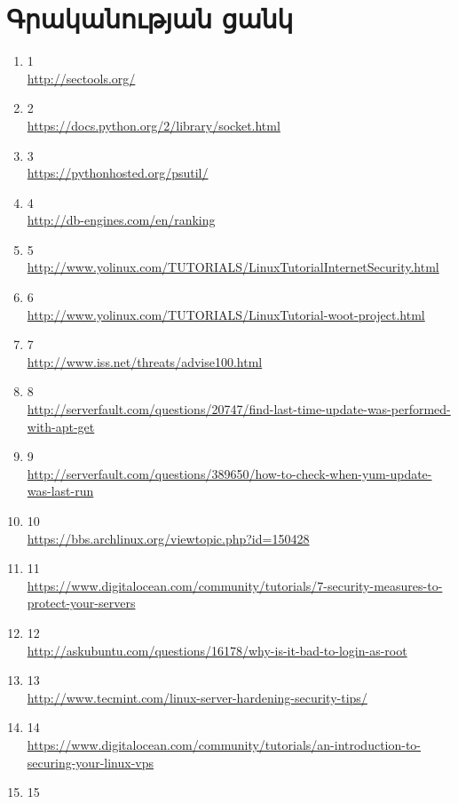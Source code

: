 \documentclass[12pt]{article}
\begin{document}
\begin{sloppypar}
\section*{Գրականության ցանկ}
\begin{enumerate}
\item 1 \\
	\url{http://sectools.org/}
\item 2 \\
	\url{https://docs.python.org/2/library/socket.html}
\item 3 \\
	\url{https://pythonhosted.org/psutil/}
\item 4 \\
	\url{http://db-engines.com/en/ranking}
\item 5 \\
	\url{http://www.yolinux.com/TUTORIALS/LinuxTutorialInternetSecurity.html}
\item 6 \\
	\url{http://www.yolinux.com/TUTORIALS/LinuxTutorial-woot-project.html}
\item 7 \\
	\url{http://www.iss.net/threats/advise100.html}
\item 8 \\
	\url{http://serverfault.com/questions/20747/find-last-time-update-was-performed-with-apt-get}
\item 9 \\
	\url{http://serverfault.com/questions/389650/how-to-check-when-yum-update-was-last-run}
\item 10 \\
	\url{https://bbs.archlinux.org/viewtopic.php?id=150428}
\item 11 \\
	\url{https://www.digitalocean.com/community/tutorials/7-security-measures-to-protect-your-servers}
\item 12 \\
	\url{http://askubuntu.com/questions/16178/why-is-it-bad-to-login-as-root}
\item 13 \\
	\url{http://www.tecmint.com/linux-server-hardening-security-tips/}
\item 14 \\
	\url{https://www.digitalocean.com/community/tutorials/an-introduction-to-securing-your-linux-vps}
\item 15 \\

\end{enumerate}
\end{sloppypar}
\end{document}
